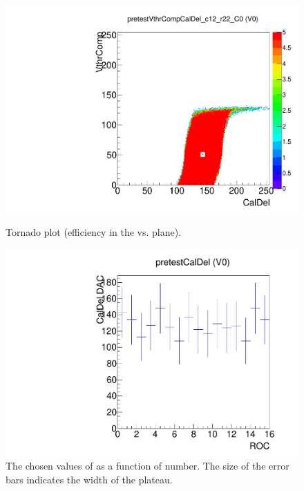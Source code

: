 \begin{figure}[!htp]
\centering
\begin{minipage}{0.45\textwidth}
  \includegraphics[width=1.0\textwidth]{figures/pretest_pretestVthrCompCalDel_c12_r22.pdf}
  \caption{Tornado plot (efficiency in the \vthrcomp vs. \caldel plane).}
  \label{fig:pretest_pretestVthrCompCalDel_c12_r22}
\end{minipage}
\hspace{0.3cm}
\begin{minipage}{0.45\textwidth}
  \includegraphics[width=1.0\textwidth]{figures/pretest_pretestCalDel.pdf}
  \caption{The chosen values of \caldel as a function of \roc
    number. The size of the error bars indicates the width of the
    \caldel plateau.}
  \label{fig:pretest_pretestCalDel}
\end{minipage}
\end{figure}



